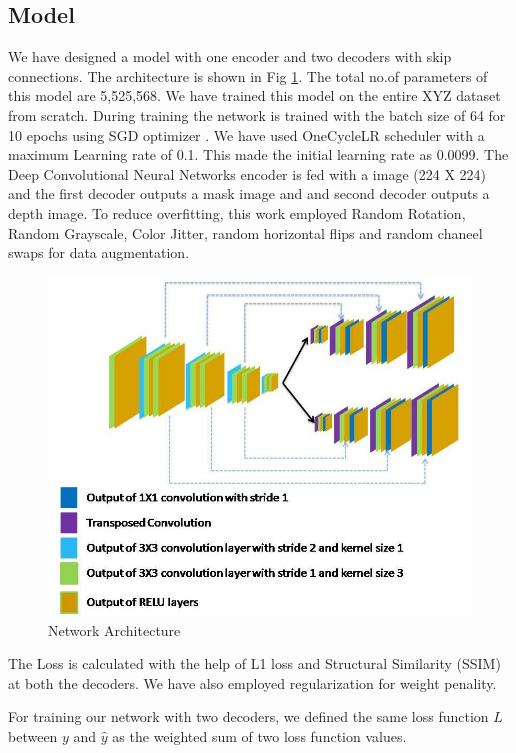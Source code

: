 \documentclass{article}
\begin{document}
\subsection{Model}
We have designed a model with one encoder and two decoders with skip connections. 
The architecture is shown in Fig \ref{fig:modelarch}. The total no.of parameters of this model are 5,525,568. 
We have trained this model on the entire XYZ dataset from scratch. 
During training the network is trained with the batch size of 64 for 10 epochs using SGD optimizer \cite{bottou2010large}. 
We have used OneCycleLR scheduler \cite{smith2018disciplined} with a maximum Learning rate of 0.1. 
This made the initial learning rate as 0.0099.
The Deep Convolutional Neural Networks encoder is fed with a image (224 X 224) and the first decoder outputs a mask 
image and and second decoder outputs a depth image. To reduce overfitting\cite{perez2017effectiveness}, 
this work employed Random Rotation, Random Grayscale, Color Jitter, random horizontal flips and random chaneel swaps for data augmentation.

\begin{figure}[h!]
\centering
  \includegraphics[width=1\textwidth]{networkarchitecture.jpg}
  \caption{Network Architecture}
  \label{fig:modelarch}
\end{figure}

The Loss is calculated with the help of L1 loss and Structural Similarity (SSIM) at both the decoders. 
We have also employed regularization for weight penality.

For training our network with two decoders, we defined the same loss function $L$ between $y$ and $\hat{y}$ as the weighted sum of 
two loss function values.
\end{document}
